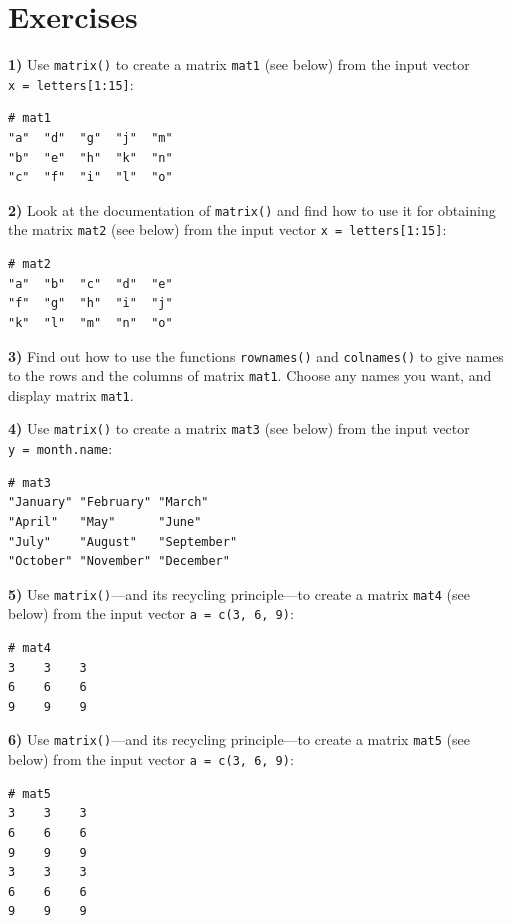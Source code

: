\documentclass[
]{book}
\begin{document}
\hypertarget{exercises-4}{%
\section{Exercises}\label{exercises-4}}

\textbf{1)} Use \texttt{matrix()} to create a matrix \texttt{mat1} (see below) from the input
vector \texttt{x\ =\ letters{[}1:15{]}}:

\begin{verbatim}
# mat1
"a"  "d"  "g"  "j"  "m" 
"b"  "e"  "h"  "k"  "n" 
"c"  "f"  "i"  "l"  "o"
\end{verbatim}

\textbf{2)} Look at the documentation of \texttt{matrix()} and find how to use it for
obtaining the matrix \texttt{mat2} (see below) from the input vector \texttt{x\ =\ letters{[}1:15{]}}:

\begin{verbatim}
# mat2
"a"  "b"  "c"  "d"  "e" 
"f"  "g"  "h"  "i"  "j" 
"k"  "l"  "m"  "n"  "o" 
\end{verbatim}

\textbf{3)} Find out how to use the functions \texttt{rownames()} and \texttt{colnames()} to give
names to the rows and the columns of matrix \texttt{mat1}. Choose any names you want,
and display matrix \texttt{mat1}.

\textbf{4)} Use \texttt{matrix()} to create a matrix \texttt{mat3} (see below) from the input
vector \texttt{y\ =\ month.name}:

\begin{verbatim}
# mat3
"January" "February" "March"    
"April"   "May"      "June"     
"July"    "August"   "September"
"October" "November" "December" 
\end{verbatim}

\textbf{5)} Use \texttt{matrix()}---and its recycling principle---to create a matrix \texttt{mat4}
(see below) from the input vector \texttt{a\ =\ c(3,\ 6,\ 9)}:

\begin{verbatim}
# mat4
3    3    3
6    6    6
9    9    9
\end{verbatim}

\textbf{6)} Use \texttt{matrix()}---and its recycling principle---to create a matrix \texttt{mat5}
(see below) from the input vector \texttt{a\ =\ c(3,\ 6,\ 9)}:

\begin{verbatim}
# mat5
3    3    3
6    6    6
9    9    9
3    3    3
6    6    6
9    9    9
\end{verbatim}
\end{document}
